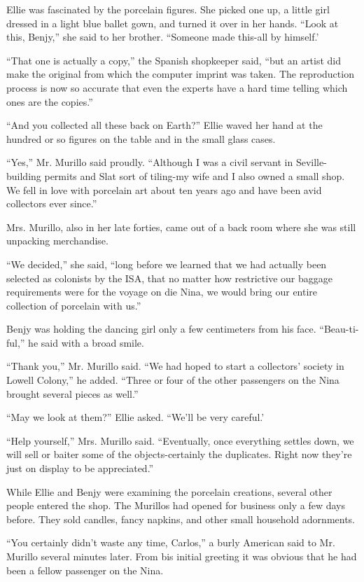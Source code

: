 \documentclass[]{article}
\begin{document}
{Ellie was fascinated by the porcelain figures. She picked one up, a little girl dressed in a light blue ballet gown, and turned it over in her hands. “Look at this, Benjy,” she said to her brother. “Someone made this-all by himself.’

“That one is actually a copy,” the Spanish shopkeeper said, “but an artist did make the original from which the computer imprint was taken. The reproduction process is now so accurate that even the experts have a hard time telling which ones are the copies.”

“And you collected all these back on Earth?” Ellie waved her hand at the hundred or so figures on the table and in the small glass cases.

“Yes,” Mr. Murillo said proudly. “Although I was a civil servant in Seville-building permits and Slat sort of tiling-my wife and I also owned a small shop. We fell in love with porcelain art about ten years ago and have been avid collectors ever since.”

Mrs. Murillo, also in her late forties, came out of a back room where she was still unpacking merchandise.

“We decided,” she said, “long before we learned that we had actually been selected as colonists by the ISA, that no matter how restrictive our baggage requirements were for the voyage on die Nina, we would bring our entire collection of porcelain with us.”

Benjy was holding the dancing girl only a few centimeters from his face. “Beau-ti-ful,” he said with a broad smile.

“Thank you,” Mr. Murillo said. “We had hoped to start a collectors’ society in Lowell Colony,” he added. “Three or four of the other passengers on the Nina brought several pieces as well.”

“May we look at them?” Ellie asked. “We’ll be very careful.’

“Help yourself,” Mrs. Murillo said. “Eventually, once everything settles down, we will sell or baiter some of the objects-certainly the duplicates. Right now they’re just on display to be appreciated.”

While Ellie and Benjy were examining the porcelain creations, several other people entered the shop. The Murillos had opened for business only a few days before. They sold candles, fancy napkins, and other small household adornments.

“You certainly didn’t waste any time, Carlos,” a burly American said to Mr. Murillo several minutes later. From bis initial greeting it was obvious that he had been a fellow passenger on the Nina.

}
\end{document}
